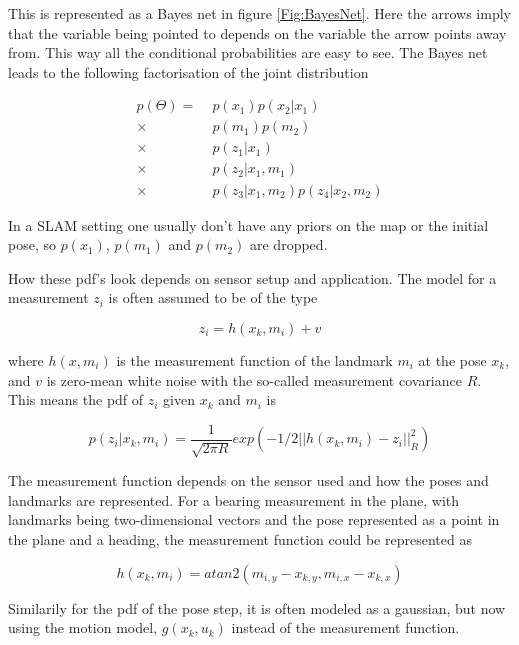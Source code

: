 This is represented as a Bayes net in figure \ref{Fig:BayesNet}. Here the arrows imply that the variable being pointed to depends on the variable the arrow points away from. This way all the conditional probabilities are easy to see. The Bayes net leads to the following factorisation of the joint distribution

\begin{align}
    p(\Theta) = \; & p(x_1)p(x_2|x_1) \\
    \times \; &p(m_1)p(m_2) \nonumber \\
    \times \; &p(z_1|x_1) \nonumber \\
    \times \; &p(z_2|x_1,m_1) \nonumber \\ 
    \times \; &p(z_3|x_1,m_2)p(z_4|x_2,m_2) \nonumber 
\end{align}

In a SLAM setting one usually don't have any priors on the map or the initial pose, so $p(x_1)$, $p(m_1)$ and $p(m_2)$ are dropped. 

How these pdf's look depends on sensor setup and application. The model for a measurement $z_i$ is often assumed to be of the type

\begin{equation}
    z_i = h(x_k,m_i) + v
\end{equation}

where $h(x,m_i)$ is the measurement function of the landmark $m_i$ at the pose $x_k$, and $v$ is zero-mean white noise with the so-called measurement covariance $R$. This means the pdf of $z_i$ given $x_k$ and $m_i$ is 

\begin{equation}
    p(z_i|x_k,m_i) = \frac{1}{\sqrt{2\pi R}}exp(-1/2||h(x_k,m_i) - z_i||^2_R)
\end{equation}

The measurement function depends on the sensor used and how the poses and landmarks are represented. For a bearing measurement in the plane, with landmarks being two-dimensional vectors and the pose represented as a point in the plane and a heading, the measurement function could be represented as

\begin{equation}
    h(x_k,m_i) = atan2(m_{i,y} - x_{k,y},m_{i,x} - x_{k,x})
\end{equation}

Similarily for the pdf of the pose step, it is often modeled as a gaussian, but now using the motion model, $g(x_k,u_k)$ instead of the measurement function. 

